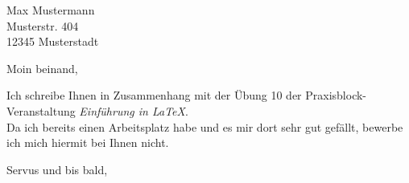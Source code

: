 \documentclass[a4paper]{scrlttr2}
\begin{document}
\begin{letter}{
    Max Mustermann \\
    Musterstr. 404 \\
    12345 Musterstadt
}

\opening{Moin beinand,}
Ich schreibe Ihnen in Zusammenhang mit der Übung 10 der Praxisblock-Veranstaltung 
\emph{Einführung in \LaTeX}. \\
Da ich bereits einen Arbeitsplatz habe und es mir dort sehr gut gefällt,
bewerbe ich mich hiermit bei Ihnen nicht.



\closing{Servus und bis bald,}


\end{letter}
\end{document}
